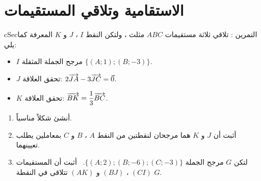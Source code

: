 \documentclass[12pt,a4paper]{article}
\newenvironment{BOX}[2]{\begin{otherlanguage}{english}\begin{arbox}{#1}{#2}}{\end{arbox}\end{otherlanguage}}
\newcounter{exo}
\newenvironment{tamrin}[1]{\stepcounter{exo}\begin{BOX}{cSec}{التمرين \theexo: #1}}{\end{BOX}}
\begin{document}
\section{الاستقامية وتلاقي المستقيمات}
\begin{tamrin}{تلاقي ثلاثة مستقيمات}
$ABC$ مثلث ، ولتكن النقط $I$ ، $J$ و $K$ المعرفة كما يلي:
\begin{itemize}
\item $I$ مرجح الجملة المثقلة $\{(A;1);(B;-3)\}$.
\item $J$ تحقق العلاقة: $2\overrightarrow{JA}-3\overrightarrow{JC}=\vec0$.
\item $K$ تحقق العلاقة: $\overrightarrow{BK}=\dfrac13\overrightarrow{BC}$.
\end{itemize}
\begin{enumerate}
\item أنشئ شكلاً مناسباً.
\item أثبت أن $J$ و $K$ هما مرجحان لنقطتين من النقط $A$ ، $B$ و $C$ بمعاملين يطلب تعيينهما.
\item لتكن $G$ مرجح الجملة $\{(A;2);(B;-6);(C;-3)\}$. \ أثبت أن المستقيمات $(CI)$ ، $(BJ)$ و $(AK)$ تتلاقى في النقطة $G$.
\end{enumerate}
\end{tamrin}
\end{document}
